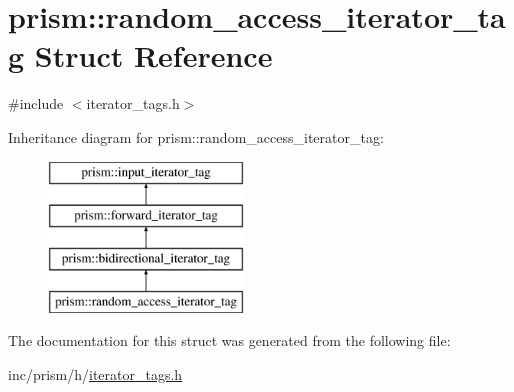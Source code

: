 \hypertarget{structprism_1_1random__access__iterator__tag}{}\section{prism\+:\+:random\+\_\+access\+\_\+iterator\+\_\+tag Struct Reference}
\label{structprism_1_1random__access__iterator__tag}


{\ttfamily \#include $<$iterator\+\_\+tags.\+h$>$}

Inheritance diagram for prism\+:\+:random\+\_\+access\+\_\+iterator\+\_\+tag\+:\begin{figure}[H]
\begin{center}
\leavevmode
\includegraphics[height=4.000000cm]{structprism_1_1random__access__iterator__tag}
\end{center}
\end{figure}


The documentation for this struct was generated from the following file\+:\begin{DoxyCompactItemize}
\item 
inc/prism/h/\hyperlink{iterator__tags_8h}{iterator\+\_\+tags.\+h}\end{DoxyCompactItemize}
